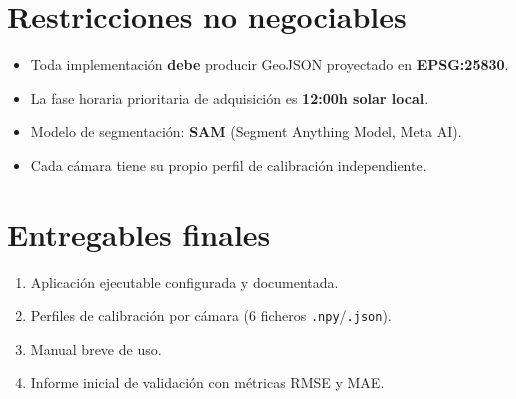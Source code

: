 \section{Restricciones no negociables}

\begin{itemize}
  \item Toda implementación \textbf{debe} producir GeoJSON proyectado en \textbf{EPSG:25830}.
  \item La fase horaria prioritaria de adquisición es \textbf{12:00h solar local}.
  \item Modelo de segmentación: \textbf{SAM} (Segment Anything Model, Meta AI).
  \item Cada cámara tiene su propio perfil de calibración independiente.
\end{itemize}

\section{Entregables finales}

\begin{enumerate}
  \item Aplicación ejecutable configurada y documentada.
  \item Perfiles de calibración por cámara (6 ficheros \texttt{.npy}/\texttt{.json}).
  \item Manual breve de uso.
  \item Informe inicial de validación con métricas RMSE y MAE.
\end{enumerate}
